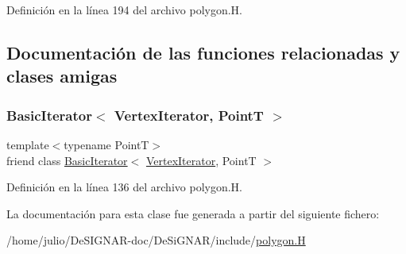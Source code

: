 Definición en la línea 194 del archivo polygon.\+H.



\subsection{Documentación de las funciones relacionadas y clases amigas}
\mbox{\label{class_designar_1_1_gen_polygon_1_1_vertex_iterator_a580630487e8bbe9b1152cc636325bee6}} 
\subsubsection{\texorpdfstring{Basic\+Iterator$<$ Vertex\+Iterator, Point\+T $>$}{BasicIterator< VertexIterator, PointT >}}
{\footnotesize\ttfamily template$<$typename PointT$>$ \\
friend class \hyperlink{class_designar_1_1_basic_iterator}{Basic\+Iterator}$<$ \hyperlink{class_designar_1_1_gen_polygon_1_1_vertex_iterator}{Vertex\+Iterator}, PointT $>$\hspace{0.3cm}{\ttfamily [friend]}}



Definición en la línea 136 del archivo polygon.\+H.



La documentación para esta clase fue generada a partir del siguiente fichero\+:\begin{DoxyCompactItemize}
\item 
/home/julio/\+De\+S\+I\+G\+N\+A\+R-\/doc/\+De\+Si\+G\+N\+A\+R/include/\hyperlink{polygon_8_h}{polygon.\+H}\end{DoxyCompactItemize}
